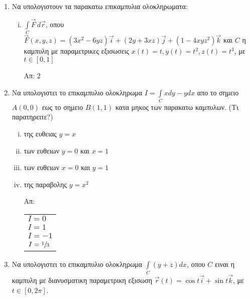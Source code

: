 


\thispagestyle{empty}
\everymath{\displaystyle}



\begin{center}
\end{center}

\vspace{\baselineskip}

\begin{enumerate} 

\item Να υπολογιστουν τα παρακατω επικαμπυλια ολοκληρωματα:

\begin{enumerate}[i)]

\item $\int\limits_C \vec{F}\,d\vec{r}$, οπου $\vec{F}(x,y,z)=(3x^2-6yz)\vec{i}+(2y+3xz)\vec{j}+(1-4xyz^2)\vec{k}$ και $C$ η καμπυλη με παραμετρικες εξισωσεις $x(t)=t, y(t)=t^2, z(t)=t^3$, με $t\in [0,1]$

\hfill Απ: $2$

\end{enumerate}

\item Να υπολογιστει το επικαμπυλιο ολοκληρωμα $I=\int\limits_C xdy-ydx$ απο το σημειο $A(0,0)$ εως το σημειο $B(1,1)$ κατα μηκος των παρακατω καμπυλων. (Τι παρατηρειτε?)

\begin{enumerate}[i)]
\item της ευθειας $y=x$
\item των ευθειων $y=0$ και $x=1$
\item των ευθειων $x=0$ και $y=1$
\item της παραβολης $y=x^2$

\hfill Απ: \begin{tabular}{l}
$I=0$ \\
$I=1$ \\
$I=-1$ \\
$I=\sfrac{1}{3}$
\end{tabular}
\end{enumerate}

\item Να υπολογιστει το επικαμπυλιο ολοκληρωμα $\int\limits_C (y+z)dx$, οπου $C$ ειναι η καμπυλη με διανυσματικη παραμετρικη εξισωση $\vec{r}(t)=\cos t\vec{i}+\sin t\vec{k}$, με $t\in [0,2\pi]$.


\end{enumerate}
